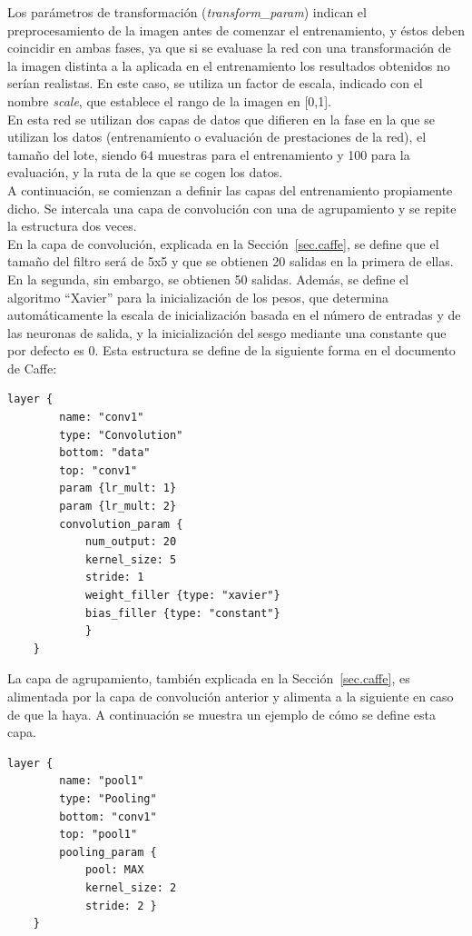 	Los parámetros de transformación (\textit{transform\_param}) indican el preprocesamiento de la imagen antes de comenzar el entrenamiento, y éstos deben coincidir en ambas fases, ya que si se evaluase la red con una transformación de la imagen distinta a la aplicada en el entrenamiento los resultados obtenidos no serían realistas. En este caso, se utiliza un factor de escala, indicado con el nombre \textit{scale}, que establece el rango de la imagen en [0,1]. \\
	En esta red se utilizan dos capas de datos que difieren en la fase en la que se utilizan los datos (entrenamiento o evaluación de prestaciones de la red), el tamaño del lote, siendo 64 muestras para el entrenamiento y 100 para la evaluación, y la ruta de la que se cogen los datos.\\
	
	A continuación, se comienzan a definir las capas del entrenamiento propiamente dicho. Se intercala una capa de convolución con una de agrupamiento y se repite la estructura dos veces.\\
	
	En la capa de convolución, explicada en la Sección~\ref{sec.caffe}, se define que el tamaño del filtro será de 5x5 y que se obtienen 20 salidas en la primera de ellas. En la segunda, sin embargo, se obtienen 50 salidas. Además, se define el algoritmo ``Xavier'' para la inicialización de los pesos, que determina automáticamente la escala de inicialización basada en el número de entradas y de las neuronas de salida, y la inicialización del sesgo mediante una constante que por defecto es 0. Esta estructura se define de la siguiente forma en el documento de Caffe:
	\vspace{20pt}
	\begin{lstlisting}[frame=single]
	layer {
		name: "conv1"
		type: "Convolution"
		bottom: "data"
		top: "conv1"
		param {lr_mult: 1}
		param {lr_mult: 2}
		convolution_param {
			num_output: 20
			kernel_size: 5
			stride: 1
			weight_filler {type: "xavier"}
			bias_filler {type: "constant"}
			}
	}	
	\end{lstlisting}
	
	La capa de agrupamiento, también explicada en la Sección~\ref{sec.caffe}, es alimentada por la capa de convolución anterior y alimenta a la siguiente en caso de que la haya. A continuación se muestra un ejemplo de cómo se define esta capa.
	\vspace{10pt}
	\begin{lstlisting}[frame=single]
	layer {
		name: "pool1"
		type: "Pooling"
		bottom: "conv1"
		top: "pool1"
		pooling_param {
			pool: MAX
			kernel_size: 2
			stride: 2 }
	}	
	\end{lstlisting}
	
